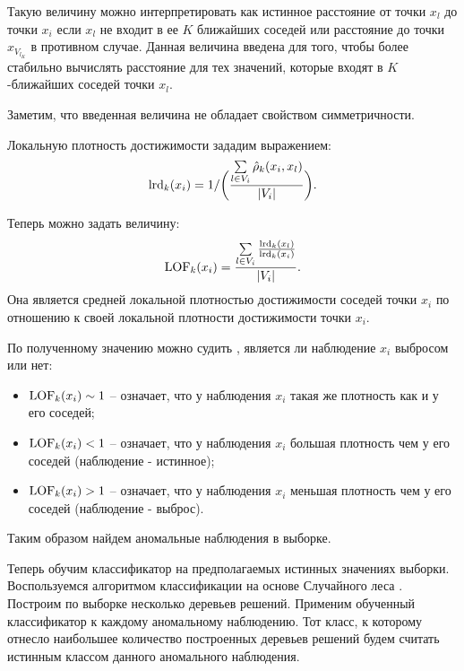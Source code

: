 Такую величину можно интерпретировать как истинное расстояние от точки $x_l$ до точки $x_i$ если $x_l$ не входит в ее $K$ ближайших соседей или расстояние до точки $x_{V_{l_K}}$ в противном случае. 
Данная величина введена для того, чтобы более стабильно вычислять расстояние для тех значений, которые входят в $K$-ближайших соседей точки $x_l$. 

Заметим, что введенная величина не обладает свойством симметричности.

Локальную плотность достижимости зададим выражением:
\begin{eqnarray}
    \textup{lrd}_k(x_i) = 1 / \bigg(\frac{\sum\limits_{l\in V_i}\hat{\rho}_k(x_i, x_l)}{|V_i|}\bigg).
\end{eqnarray}

Теперь можно задать величину:
\begin{eqnarray}
    \textup{LOF}_k(x_i) = \frac{\sum\limits_{l\in V_i}\frac{\textup{lrd}_k(x_l)}{\textup{lrd}_k(x_i)}}{|V_i|}.
\end{eqnarray}
Она является средней локальной плотностью достижимости соседей точки $x_i$ по отношению к своей локальной плотности достижимости точки $x_i$. 

По полученному значению можно судить \cite{LOF}, является ли наблюдение $x_i$ выбросом или нет:
\begin{itemize}
    \item $\textup{LOF}_k(x_i)\sim 1$   -- означает, что у наблюдения $x_i$ такая же плотность как и у его соседей;\\
    \item $\textup{LOF}_k(x_i)<1$  -- означает, что у наблюдения $x_i$ большая плотность чем у его соседей (наблюдение - истинное);\\
    \item $\textup{LOF}_k(x_i)>1$ -- означает, что у наблюдения $x_i$ меньшая плотность чем у его соседей (наблюдение - выброс).
\end{itemize}

Таким образом найдем аномальные наблюдения в выборке.

Теперь обучим классификатор на предполагаемых истинных значениях выборки. Воспользуемся алгоритмом классификации на основе Случайного леса \cite{RANDOM_FORESTS}. Построим по выборке несколько деревьев решений. 
Применим обученный классификатор к каждому аномальному наблюдению. Тот класс, к которому отнесло наибольшее количество построенных деревьев решений будем считать истинным классом данного аномального наблюдения.

